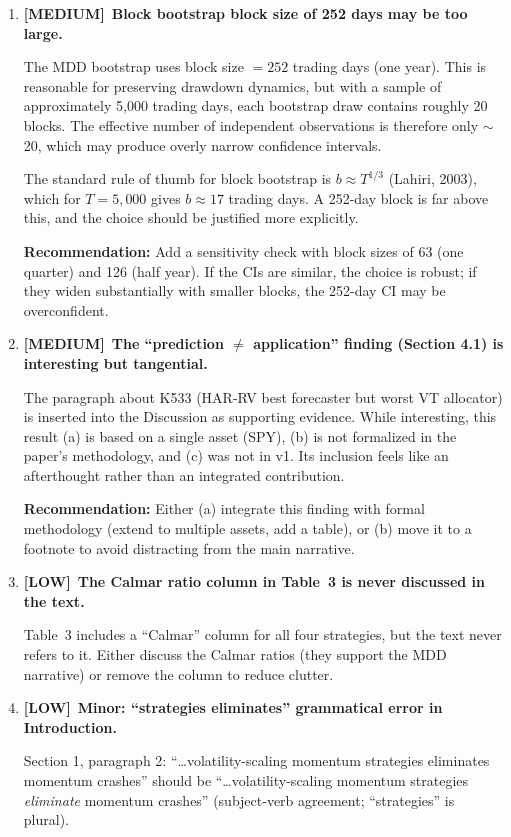 \documentclass[12pt,a4paper]{article}
\newcommand{\MEDIUM}{\textcolor{medsev}{\textbf{[MEDIUM]}}}
\newcommand{\LOW}{\textcolor{lowsev}{\textbf{[LOW]}}}
\begin{document}
\begin{enumerate}[label=\textbf{C.\arabic*}]
\item \MEDIUM\ \textbf{Block bootstrap block size of 252 days may be too large.}

The MDD bootstrap uses block size $= 252$ trading days (one year). This is reasonable for preserving drawdown dynamics, but with a sample of approximately 5,000 trading days, each bootstrap draw contains roughly 20 blocks. The effective number of independent observations is therefore only $\sim$20, which may produce overly narrow confidence intervals.

The standard rule of thumb for block bootstrap is $b \approx T^{1/3}$ (Lahiri, 2003), which for $T = 5{,}000$ gives $b \approx 17$ trading days. A 252-day block is far above this, and the choice should be justified more explicitly.

\textbf{Recommendation:} Add a sensitivity check with block sizes of 63 (one quarter) and 126 (half year). If the CIs are similar, the choice is robust; if they widen substantially with smaller blocks, the 252-day CI may be overconfident.


\item \MEDIUM\ \textbf{The ``prediction $\neq$ application'' finding (Section 4.1) is interesting but tangential.}

The paragraph about K533 (HAR-RV best forecaster but worst VT allocator) is inserted into the Discussion as supporting evidence. While interesting, this result (a) is based on a single asset (SPY), (b) is not formalized in the paper's methodology, and (c) was not in v1. Its inclusion feels like an afterthought rather than an integrated contribution.

\textbf{Recommendation:} Either (a) integrate this finding with formal methodology (extend to multiple assets, add a table), or (b) move it to a footnote to avoid distracting from the main narrative.


\item \LOW\ \textbf{The Calmar ratio column in Table~3 is never discussed in the text.}

Table~3 includes a ``Calmar'' column for all four strategies, but the text never refers to it. Either discuss the Calmar ratios (they support the MDD narrative) or remove the column to reduce clutter.


\item \LOW\ \textbf{Minor: ``strategies eliminates'' grammatical error in Introduction.}

Section 1, paragraph 2: ``\ldots volatility-scaling momentum strategies eliminates momentum crashes'' should be ``\ldots volatility-scaling momentum strategies \textit{eliminate} momentum crashes'' (subject-verb agreement; ``strategies'' is plural).

\end{enumerate}
\end{document}
